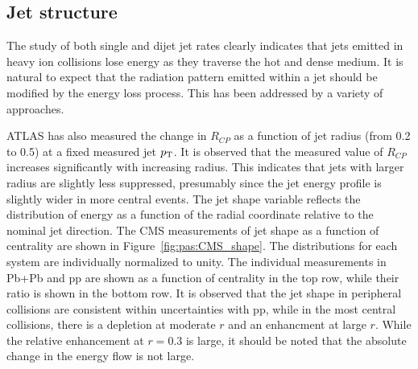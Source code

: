 \subsection{Jet structure}

The study of both single and dijet jet rates clearly indicates that jets emitted in heavy ion 
collisions lose energy as they traverse the hot and dense medium.  It is natural to expect
that the radiation pattern emitted within a jet should be modified by the energy loss
process.  This has been addressed by a variety of approaches.

ATLAS has also measured the change in $R_{CP}$ as a function of jet radius (from 0.2 to 0.5) at
a fixed measured jet $\mbox{$p_{\mathrm{T}}$}$.%
It is observed that the measured value of $R_{CP}$ increases significantly with increasing radius.
This indicates that jets with larger radius are slightly less suppressed, presumably since 
the jet energy profile is slightly wider in more central events.
%
The jet shape variable reflects the distribution of energy as a function of the radial coordinate
relative to the nominal jet direction.
The CMS measurements of jet shape as a function of centrality are shown in Figure~\ref{fig:pas:CMS_shape}.
The distributions for each system are individually normalized to unity.
The individual measurements in Pb+Pb and pp are shown as a function of centrality in the top row,
while their ratio is shown in the bottom row.
It is observed that the jet shape in peripheral collisions are consistent within uncertainties with pp,
while in the most central collisions, there is a depletion at moderate $r$ and an enhancment at large $r$.
While the relative enhancement at $r=0.3$ is large, it should be noted that the absolute change in the energy
flow is not large.


